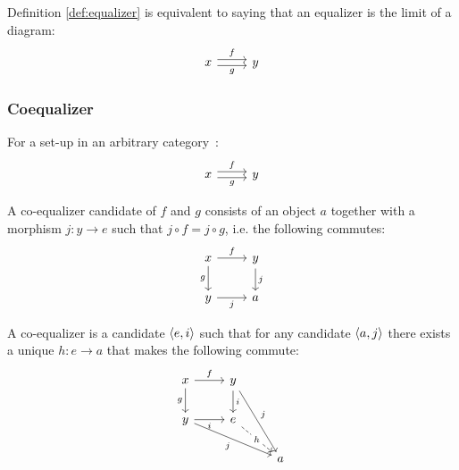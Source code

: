 \begin{definition}
  Definition \ref{def:equalizer} is equivalent to saying that an equalizer is
  the limit of a diagram:
  \[\begin{tikzcd}[ampersand replacement=\&]
    x \& y
    \arrow["f", shift left=1, from=1-1, to=1-2]
    \arrow["g"', shift right=1, from=1-1, to=1-2]
  \end{tikzcd}\]
\end{definition}

\subsubsection*{Coequalizer}

\begin{definition}
  For a set-up in an arbitrary
  category~\parencite[p.~128]{leinster:basic_category_theory}:
  \[\begin{tikzcd}[ampersand replacement=\&]
    x \& y
    \arrow["f", shift left=1, from=1-1, to=1-2]
    \arrow["g"', shift right=1, from=1-1, to=1-2]
  \end{tikzcd}\]

  A co-equalizer candidate of $f$ and $g$ consists of an object $a$ together
  with a morphism $j:y\to e$ such that $j\circ f = j\circ g$, i.e. the following
  commutes:
  \[\begin{tikzcd}[ampersand replacement=\&]
    x \& y \\
    y \& a
    \arrow["j"', from=2-1, to=2-2]
    \arrow["g"', from=1-1, to=2-1]
    \arrow["f", from=1-1, to=1-2]
    \arrow["j", from=1-2, to=2-2]
  \end{tikzcd}\]

  A co-equalizer is a candidate $\langle e, i\rangle$ such that for any candidate $\langle a,
  j\rangle$ there exists a unique $h: e\to a$ that makes the following commute:
  \[\begin{tikzcd}[ampersand replacement=\&]
    x \& y \\
    y \& e \\
    \&\& a
    \arrow["i", from=1-2, to=2-2]
    \arrow["i"', from=2-1, to=2-2]
    \arrow["g"', from=1-1, to=2-1]
    \arrow["f", from=1-1, to=1-2]
    \arrow["j"', from=2-1, to=3-3]
    \arrow["j", from=1-2, to=3-3]
    \arrow["h"{description}, dashed, from=2-2, to=3-3]
  \end{tikzcd}\]
\end{definition}

